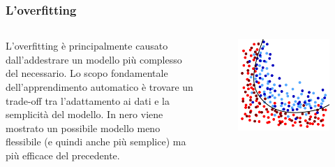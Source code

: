 \begin{frame}

	\frametitle{L'overfitting}

	\begin{columns}
			L'overfitting è principalmente causato dall'addestrare un modello più complesso del necessario.
			\newlinedouble
			Lo scopo fondamentale dell'apprendimento automatico è trovare un trade-off tra l'adattamento ai dati e la semplicità del modello.
			\newlinedouble
			In nero viene mostrato un possibile modello meno flessibile (e quindi anche più semplice) ma più efficace del precedente.
			\begin{figure}[!htbp]
				\centering
				\includegraphics[width=1.0\linewidth]{images/supervised/validation_test_training_peril_of_overfitting/overfitting_black_line_with_test.pdf}
			\end{figure}

	\end{columns}
\end{frame}



